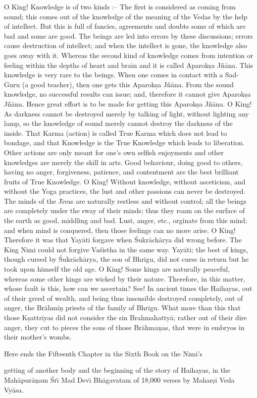 O King! Knowledge is of two kinds :-- The first is considered as coming from sound; this comes out of the knowledge of the meaning of the Vedas by the help of intellect. But this is full of fancies, agreements and doubts some of which are bad and some are good. The beings are led into errors by these discussions; errors cause destruction of intellect; and when the intellect is gone, the knowledge also goes away with it. Whereas the second kind of knowledge comes from intention or feeling within the depths of heart and brain and it is called Aparok\d{s}a J\~n\=ana. This knowledge is very rare to the beings. When one comes in contact with a Sad-Guru (a good teacher), then one gets this Aparok\d{s}a J\~n\=ana. From the sound knowledge, no successful results can issue; and, therefore it cannot give Aparok\d{s}a J\~n\=ana. Hence great effort is to be made for getting this Aparok\d{s}a J\~n\=ana. O King! As darkness cannot be destroyed merely by talking of light, without lighting any lamp, so the knowledge of sound merely cannot destroy the darkness of the inside. That Karma (action) is called True Karma which does not lead to bondage, and that Knowledge is the True Knowledge which leads to liberation. Other actions are only meant for one's own selfish enjoyments and other knowledges are merely the skill in arts. Good behaviour, doing good to others, having no anger, forgiveness, patience, and contentment are the best brilliant fruits of True Knowledge. O King! Without knowledge, without asceticism, and without the Yoga practices, the lust and other passions can never be destroyed. The minds of the J\={\i}vas are naturally restless and without control; all the beings are completely under the sway of their minds; thus they roam on the surface of the earth as good, middling and bad. Lust, anger, etc., orginate from this mind; and when mind is conquered, then those feelings can no more arise. O King! Therefore it was that Yay\=ati forgave when \'Sukr\=ach\=arya did wrong before. The King Nimi could not forgive Va\'sistha in the same way. Yay\=ati; the best of kings, though cursed by \'Sukr\=ach\=arya, the son of Bhrigu, did not curse in return but he took upon himself the old age. O King! Some kings are naturally peaceful, whereas some other kings are wicked by their nature. Therefore, in this matter, whose fault is this, how can we ascertain? See! In ancient times the Haihayas, out of their greed of wealth, and being thus insensible destroyed completely, out of anger, the Br\=ahmi\d{n} priests of the family of Bhrigu. What more than this that those K\d{s}attriyas did not consider the sin Brahmahatty\=a; rather out of their dire anger, they cut to pieces the sons of those Br\=ahma\d{n}as, that were in embryos in their mother's wombs.

Here ends the Fifteenth Chapter in the Sixth Book on the Nimi's

getting of another body and the beginning of the story of Haihayas, in the Mah\=apur\=a\d{n}am \'Sr\={\i} Mad Dev\={\i} Bh\=agavatam of 18,000 verses by Mahar\d{s}i Veda Vy\=asa.



